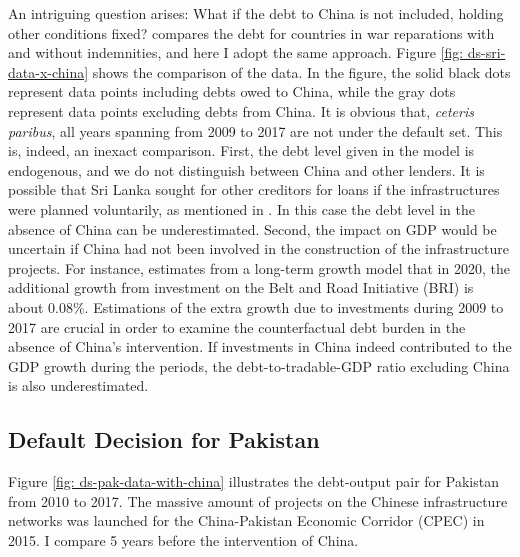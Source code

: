 An intriguing question arises: What if the debt to China is not included, holding other conditions fixed? \citet{Hinrichsen_2020-chapter4} compares the debt for countries in war reparations with and without indemnities, and here I adopt the same approach. Figure \ref{fig: ds-sri-data-x-china} shows the comparison of the data. In the figure, the solid black dots represent data points including debts owed to China, while the gray dots represent data points excluding debts from China.
It is obvious that, \emph{ceteris paribus}, all years spanning from 2009 to 2017 are not under the default set. This is, indeed, an inexact comparison.
First, the debt level given in the model is endogenous, and we do not distinguish between China and other lenders. It is possible that Sri Lanka sought for other creditors for loans if the infrastructures were planned voluntarily, as mentioned in \citet{Brautigam-meme-2020}. In this case the debt level in the absence of China can be underestimated.
Second, the impact on GDP would be uncertain if China had not been involved in the construction of the infrastructure projects. For instance, \citet{Bandiera-Vasileios-BRI-debt} estimates from a long-term growth model that in 2020, the additional growth from investment on the Belt and Road Initiative (BRI) is about 0.08\%.
Estimations of the extra growth due to investments during 2009 to 2017 are crucial in order to examine the counterfactual debt burden in the absence of China's intervention. If investments in China indeed contributed to the GDP growth during the periods, the debt-to-tradable-GDP ratio excluding China is also underestimated.

\subsection{Default Decision for Pakistan}

Figure \ref{fig: ds-pak-data-with-china} illustrates the debt-output pair for Pakistan from 2010 to 2017. The massive amount of projects on the Chinese infrastructure networks was launched for the China-Pakistan Economic Corridor (CPEC) in 2015. I compare 5 years before the intervention of China.

